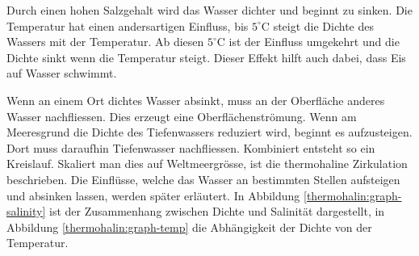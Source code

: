 Durch einen hohen Salzgehalt wird das Wasser dichter und beginnt zu sinken. Die Temperatur hat einen andersartigen Einfluss, bis $5^\circ\text{C}$ steigt die Dichte des Wassers mit der Temperatur. Ab diesen $5^\circ\text{C}$ ist der Einfluss umgekehrt und die Dichte sinkt wenn die Temperatur steigt. Dieser Effekt hilft auch dabei, dass Eis auf Wasser schwimmt.

Wenn an einem Ort dichtes Wasser absinkt, muss an der Oberfläche anderes Wasser nachfliessen. Dies erzeugt eine Oberflächenströmung. Wenn am Meeresgrund die Dichte des Tiefenwassers reduziert wird, beginnt es aufzusteigen. Dort muss daraufhin Tiefenwasser nachfliessen. Kombiniert entsteht so ein Kreislauf. Skaliert man dies auf Weltmeergrösse, ist die thermohaline Zirkulation beschrieben. Die Einflüsse, welche das Wasser an bestimmten Stellen aufsteigen und absinken lassen, werden später erläutert. 
In Abbildung \ref{thermohalin:graph-salinity} ist der Zusammenhang zwischen Dichte und Salinität dargestellt, in Abbildung \ref{thermohalin:graph-temp} die Abhängigkeit der Dichte von der Temperatur.

